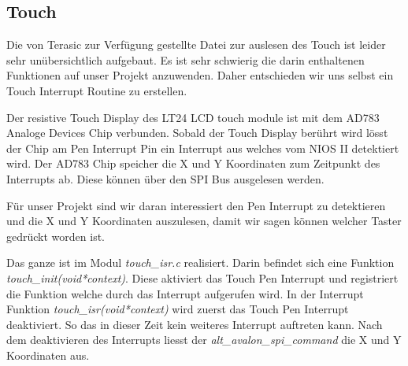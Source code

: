 \subsection{Touch}\label{subsec:touch}
 Die von Terasic zur Verfügung gestellte Datei zur auslesen des Touch ist leider sehr unübersichtlich aufgebaut. Es ist sehr schwierig die darin enthaltenen Funktionen auf unser Projekt anzuwenden. Daher entschieden wir uns selbst ein Touch Interrupt Routine zu erstellen. 
 
 Der resistive Touch Display des LT24 LCD touch module ist mit dem AD783 Analoge Devices Chip verbunden. Sobald der Touch Display berührt wird lösst der Chip am Pen Interrupt Pin ein Interrupt aus welches vom NIOS II detektiert wird. Der AD783 Chip speicher die X und Y Koordinaten zum Zeitpunkt des Interrupts ab. Diese können über den SPI Bus ausgelesen werden\cite{AD7843}. 
 
 Für unser Projekt sind wir daran interessiert den Pen Interrupt zu detektieren und die X und Y Koordinaten auszulesen, damit wir sagen können welcher Taster gedrückt worden ist.
 
Das ganze ist im Modul \textit{touch\_isr.c} realisiert. Darin befindet sich eine Funktion \\ \textit{touch\_init(void*context)}. Diese aktiviert das Touch Pen Interrupt  und registriert die Funktion welche durch das Interrupt aufgerufen wird. 
In der Interrupt Funktion \textit{touch\_isr(void*context)} wird zuerst das Touch Pen Interrupt  deaktiviert. So das in dieser Zeit kein weiteres Interrupt auftreten kann. Nach dem deaktivieren des Interrupts liesst der \textit{alt\_avalon\_spi\_command} die X und Y Koordinaten aus.